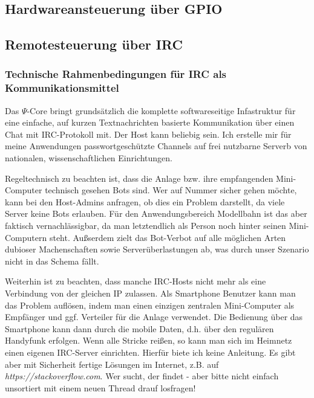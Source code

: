 \subsection{Hardwareansteuerung \"uber GPIO}
\label{sec:gpio}



\subsection{Remotesteuerung \"uber IRC}
\label{sec:remote_irc}

\subsubsection{Technische Rahmenbedingungen f\"ur IRC als Kommunikationsmittel}

Das $\Psi$-Core bringt grunds\"atzlich die komplette softwareseitige Infastruktur f\"ur eine einfache, auf kurzen Textnachrichten basierte Kommunikation \"uber einen Chat mit IRC-Protokoll mit.
Der Host kann beliebig sein.
Ich erstelle mir f\"ur meine Anwendungen passwortgesch\"utzte Channels auf frei nutzbarne Serverb von nationalen, wissenschaftlichen Einrichtungen.

Regeltechnisch zu beachten ist, dass die Anlage bzw. ihre empfangenden Mini-Computer technisch gesehen Bots sind.
Wer auf Nummer sicher gehen m\"ochte, kann bei den Host-Admins anfragen, ob dies ein Problem darstellt, da viele Server keine Bots erlauben.
F\"ur den Anwendungsbereich Modellbahn ist das aber faktisch vernachl\"assigbar, da man letztendlich als Person noch hinter seinen Mini-Computern steht.
Au{\ss}serdem zielt das Bot-Verbot auf alle m\"oglichen Arten dubioser Machenschaften sowie Server\"uberlastungen ab, was durch unser Szenario nicht in das Schema f\"allt.

Weiterhin ist zu beachten, dass manche IRC-Hosts nicht mehr als eine Verbindung von der gleichen IP zulassen.
Als Smartphone Benutzer kann man das Problem aufl\"osen, indem man einen einzigen zentralen Mini-Computer als Empf\"anger und ggf. Verteiler f\"ur die Anlage verwendet.
Die Bedienung \"uber das Smartphone kann dann durch die mobile Daten, d.h. \"uber den regul\"aren Handyfunk erfolgen.
Wenn alle Stricke rei{\ss}en, so kann man sich im Heimnetz einen eigenen IRC-Server einrichten.
Hierf\"ur biete ich keine Anleitung.
Es gibt aber mit Sicherheit fertige L\"osungen im Internet, z.B. auf \textit{https://stackoverflow.com}.
Wer sucht, der findet - aber bitte nicht einfach unsortiert mit einem neuen Thread drauf losfragen!

